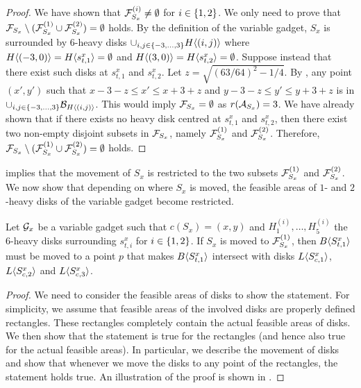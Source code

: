\begin{toappendix}
\begin{toappendix}
\begin{proof}
    We have shown that $\mathcal{F}_{S_x}^{(i)} \neq \emptyset$ for $i \in \{1,2\}$. 
    We only need to prove that $\mathcal{F}_{S_x} \setminus (\mathcal{F}_{S_x}^{(1)} \cup \mathcal{F}_{S_x}^{(2)}) = \emptyset$ holds.
    By the definition of the variable gadget, $S_x$ is surrounded by $6$-heavy disks $\cup_{i,j\in \{-3,\ldots,3\}} H\langle (i,j)\rangle$ where $H\langle (-3,0)\rangle= H\langle s_{t,1}^x\rangle = \emptyset$ and $H\langle (3,0)\rangle= H\langle s_{t,2}^x\rangle = \emptyset$.
    Suppose instead that there exist such disks at $s_{t,1}^x$ and $s_{t,2}^x$.
    Let $z = \sqrt{(63/64)^2-1/4}$.
    By , any point $(x',y')$ such that $x-3-z \le x' \le x+3+z$ and $y-3 - z \le y' \le y+3 + z$ is in $\cup_{i,j\in \{-3,\ldots,3\}} \mathcal{B}_{H\langle (i,j)\rangle}$.
    This would imply $\mathcal{F}_{S_x} = \emptyset$ as $r(\mathcal{A}_{S_x}) = 3$.
    We have already shown that if there exists no heavy disk centred at $s_{t,1}^x$ and $s_{t,2}^x$, then there exist two non-empty disjoint subsets in $\mathcal{F}_{S_x}$, namely $\mathcal{F}_{S_x}^{(1)}$ and $\mathcal{F}_{S_x}^{(2)}$.
    Therefore, $\mathcal{F}_{S_x} \setminus (\mathcal{F}_{S_x}^{(1)} \cup \mathcal{F}_{S_x}^{(2)}) = \emptyset$ holds.
\end{proof}
 implies that the movement of $S_x$ is restricted to the two subsets $\mathcal{F}_{S_x}^{(1)}$ and $\mathcal{F}_{S_x}^{(2)}$. 
We now show that depending on where $S_x$ is moved, the feasible areas of $1$- and $2$-heavy disks of the variable gadget become restricted.

\begin{mlemmarep}\label{lem:block_disk_restricted}
    Let $\mathcal{G}_{x}$ be a variable gadget such that $c(S_x) = (x,y)$ and $H_1^{(i)},\ldots,H_5^{(i)}$ the $6$-heavy disks surrounding $s^x_{t,i}$ for $i \in \{1,2\}$.
    If $S_x$ is moved to $\mathcal{F}_{S_x}^{(1)}$, then $B\langle S^x_{t,1}\rangle$ must be moved to a point $p$ that makes $B\langle S^x_{t,1}\rangle$ intersect with disks $L\langle S^x_{c,1}\rangle$, $L\langle S^x_{c,2}\rangle$ and $L\langle S^x_{c,3}\rangle$.
\end{mlemmarep}
\begin{proof}
    We need to consider the feasible areas of disks to show the statement.
    For simplicity, we assume that feasible areas of the involved disks are properly defined rectangles.
    These rectangles completely contain the actual feasible areas of disks.
    We then show that the statement is true for the rectangles (and hence also true for the actual feasible areas). 
    In particular, we describe the movement of disks and show that whenever we move the disks to any point of the rectangles, the statement holds true.
    An illustration of the proof is shown in .
    

\end{proof}
\end{toappendix}
\end{toappendix}
